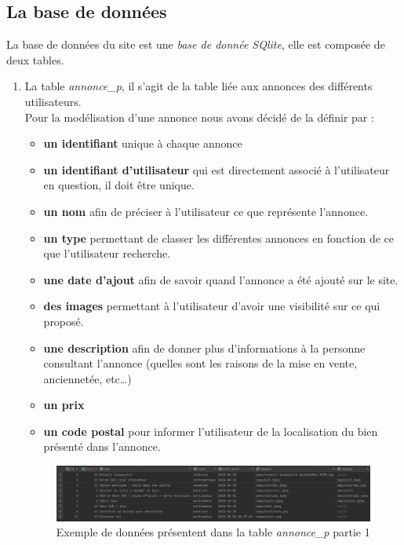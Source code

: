 \documentclass[11pt,a4paper]{article}
\begin{document}
\subsection{La base de données}
La base de données du site est une \emph{base de donnée SQlite}, elle est composée de deux tables.
\begin{enumerate}
    \item La table \emph{annonce\_p}, il s'agit de la table liée aux annonces des différents utilisateurs.\\
    Pour la modélisation d'une annonce nous avons décidé de la définir par :
    \begin{itemize}
        \item \textbf{un identifiant} unique à chaque annonce
        \item \textbf{un identifiant d'utilisateur} qui est directement associé à l'utilisateur en question, il doit être unique.
        \item \textbf{un nom} afin de préciser à l'utilisateur ce que représente l'annonce.
        \item \textbf{un type} permettant de classer les différentes annonces en fonction de ce que l'utilisateur recherche.
        \item \textbf{une date d'ajout} afin de savoir quand l'annonce a été ajouté sur le site.
        \item \textbf{des images} permettant à l'utilisateur d'avoir une visibilité sur ce qui proposé.
        \item \textbf{une description} afin de donner plus d'informations à la personne consultant l'annonce (quelles sont les raisons de la mise en vente, anciennetée, etc\dots)
        \item \textbf{un prix}
        \item \textbf{un code postal} pour informer l'utilisateur de la localisation du bien présenté dans l'annonce.
    \end{itemize}

    \begin{figure}[ht]
        \centering
        \includegraphics[scale=0.45]{annonce_p1.PNG}
        \caption{Exemple de données présentent dans la table \emph{annonce\_p} partie 1}
        \label{fig1}
    \end{figure}


\end{enumerate}
\end{document}
